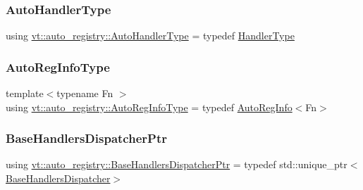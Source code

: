 \mbox{\label{namespacevt_1_1auto__registry_ae295e18699146815bb7d7674594d95d7}} 
\subsubsection{\texorpdfstring{Auto\+Handler\+Type}{AutoHandlerType}}
{\footnotesize\ttfamily using \hyperlink{namespacevt_1_1auto__registry_ae295e18699146815bb7d7674594d95d7}{vt\+::auto\+\_\+registry\+::\+Auto\+Handler\+Type} = typedef \hyperlink{namespacevt_af64846b57dfcaf104da3ef6967917573}{Handler\+Type}}

\mbox{\label{namespacevt_1_1auto__registry_af3f78826dd69454aeb914a3c7bec0a52}} 
\subsubsection{\texorpdfstring{Auto\+Reg\+Info\+Type}{AutoRegInfoType}}
{\footnotesize\ttfamily template$<$typename Fn $>$ \\
using \hyperlink{namespacevt_1_1auto__registry_af3f78826dd69454aeb914a3c7bec0a52}{vt\+::auto\+\_\+registry\+::\+Auto\+Reg\+Info\+Type} = typedef \hyperlink{structvt_1_1auto__registry_1_1_auto_reg_info}{Auto\+Reg\+Info}$<$Fn$>$}

\mbox{\label{namespacevt_1_1auto__registry_a0166496b1137bbc1b20adfeb5e19cf0e}} 
\subsubsection{\texorpdfstring{Base\+Handlers\+Dispatcher\+Ptr}{BaseHandlersDispatcherPtr}}
{\footnotesize\ttfamily using \hyperlink{namespacevt_1_1auto__registry_a0166496b1137bbc1b20adfeb5e19cf0e}{vt\+::auto\+\_\+registry\+::\+Base\+Handlers\+Dispatcher\+Ptr} = typedef std\+::unique\+\_\+ptr$<$\hyperlink{structvt_1_1auto__registry_1_1_base_handlers_dispatcher}{Base\+Handlers\+Dispatcher}$>$}

